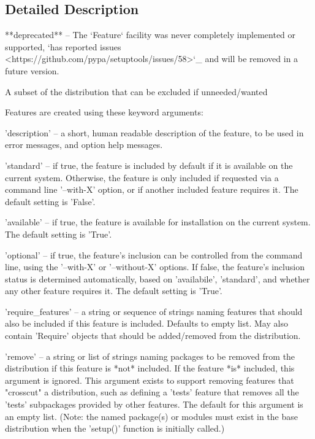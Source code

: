 \subsection{Detailed Description}
\begin{DoxyVerb}**deprecated** -- The `Feature` facility was never completely implemented
or supported, `has reported issues
<https://github.com/pypa/setuptools/issues/58>`_ and will be removed in
a future version.

A subset of the distribution that can be excluded if unneeded/wanted

Features are created using these keyword arguments:

  'description' -- a short, human readable description of the feature, to
     be used in error messages, and option help messages.

  'standard' -- if true, the feature is included by default if it is
     available on the current system.  Otherwise, the feature is only
     included if requested via a command line '--with-X' option, or if
     another included feature requires it.  The default setting is 'False'.

  'available' -- if true, the feature is available for installation on the
     current system.  The default setting is 'True'.

  'optional' -- if true, the feature's inclusion can be controlled from the
     command line, using the '--with-X' or '--without-X' options.  If
     false, the feature's inclusion status is determined automatically,
     based on 'availabile', 'standard', and whether any other feature
     requires it.  The default setting is 'True'.

  'require_features' -- a string or sequence of strings naming features
     that should also be included if this feature is included.  Defaults to
     empty list.  May also contain 'Require' objects that should be
     added/removed from the distribution.

  'remove' -- a string or list of strings naming packages to be removed
     from the distribution if this feature is *not* included.  If the
     feature *is* included, this argument is ignored.  This argument exists
     to support removing features that "crosscut" a distribution, such as
     defining a 'tests' feature that removes all the 'tests' subpackages
     provided by other features.  The default for this argument is an empty
     list.  (Note: the named package(s) or modules must exist in the base
     distribution when the 'setup()' function is initially called.)


\end{DoxyVerb}
